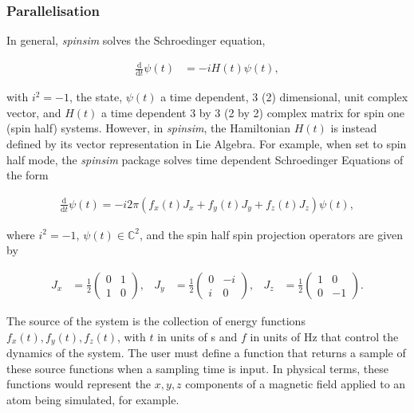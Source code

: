\documentclass{jors}
\begin{document}
		\subsubsection*{Parallelisation}
			In general, \emph{spinsim} solves the Schroedinger equation,

			\begin{align*}
				\frac{\mathrm{d}}{\mathrm{d}t}\psi(t) &= -iH(t)\psi(t),
			\end{align*}

			with \(i^2 = -1\), the state, \(\psi(t)\) a time dependent, 3 (2) dimensional, unit complex vector, and \(H(t)\) a time dependent 3 by 3 (2 by 2) complex matrix for spin one (spin half) systems. However, in \emph{spinsim}, the Hamiltonian \(H(t)\) is instead defined by its vector representation in Lie Algebra. For example, when set to spin half mode, the \emph{spinsim} package solves time dependent Schroedinger Equations of the form

			\begin{align*}
				\frac{\mathrm{d}}{\mathrm{d}t}\psi(t) = -i 2\pi (f_x(t) J_x + f_y(t) J_y + f_z(t) J_z) \psi(t),
			\end{align*}

			where \(i^2 = -1\), \(\psi(t) \in \mathbb{C}^2\), and the spin half spin projection operators are given by

			\begin{align*}
				J_x &= \frac12\begin{pmatrix}
					0 & 1 \\
					1 & 0
				\end{pmatrix},
				&J_y &= \frac12\begin{pmatrix}
					0 & -i \\
					i &  0
				\end{pmatrix},
				&J_z &= \frac12\begin{pmatrix}
					1 &  0 \\
					0 & -1
				\end{pmatrix}.
			\end{align*}

			The source of the system is the collection of energy functions \(f_x(t), f_y(t), f_z(t)\), with \(t\) in units of s and \(f\) in units of Hz that control the dynamics of the system. The user must define a function that returns a sample of these source functions when a sampling time is input. In physical terms, these functions would represent the \(x,y,z\) components of a magnetic field applied to an atom being simulated, for example.\\
\end{document}
